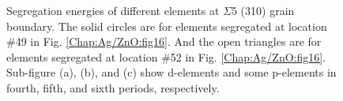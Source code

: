 \begingroup
\begin{figure}[!ht]
  \centering
\caption[Segregation energies of different elements at $\Sigma$5 (310) grain boundary.]{Segregation energies of different elements at $\Sigma$5 (310) grain boundary. The solid circles are for elements segregated at location \#49 in Fig. \ref{Chap:Ag/ZnO:fig16}. And the open triangles are for elements segregated at location \#52 in Fig. \ref{Chap:Ag/ZnO:fig16}. Sub-figure (a), (b), and (c) show d-elements and some p-elements in fourth, fifth, and sixth periods, respectively.}
\label{Chap:Ag/ZnO:fig17}
\end{figure}
\endgroup


